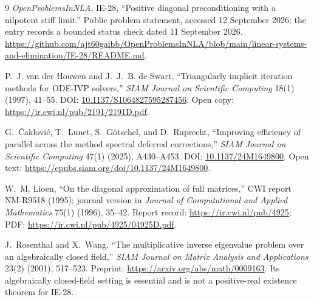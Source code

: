 \documentclass[11pt]{article}
\theoremstyle{remark}\newtheorem{remark}[theorem]{Remark}
\begin{document}
\begin{thebibliography}{9}
\emph{OpenProblemsInNLA}, IE-28, ``Positive diagonal preconditioning with a
nilpotent stiff limit.'' Public problem statement, accessed 12 September 2026;
the entry records a bounded status check dated 11 September 2026.
\url{https://github.com/ajt60gaibb/OpenProblemsInNLA/blob/main/linear-systems-and-elimination/IE-28/README.md}.

P.~J. van der Houwen and J.~J.~B. de Swart,
``Triangularly implicit iteration methods for ODE-IVP solvers,''
\emph{SIAM Journal on Scientific Computing} 18(1) (1997), 41--55.
DOI: \href{https://doi.org/10.1137/S1064827595287456}{10.1137/S1064827595287456}.
Open copy: \url{https://ir.cwi.nl/pub/2191/2191D.pdf}.

G.~\v{C}aklovi\'{c}, T.~Lunet, S.~G\"otschel, and D.~Ruprecht,
``Improving efficiency of parallel across the method spectral deferred
corrections,'' \emph{SIAM Journal on Scientific Computing} 47(1) (2025),
A430--A453. DOI: \href{https://doi.org/10.1137/24M1649800}{10.1137/24M1649800}.
Open text: \url{https://epubs.siam.org/doi/10.1137/24M1649800}.

W.~M. Lioen, ``On the diagonal approximation of full matrices,'' CWI report
NM-R9518 (1995); journal version in \emph{Journal of Computational and Applied
Mathematics} 75(1) (1996), 35--42.
Report record: \url{https://ir.cwi.nl/pub/4925};
PDF: \url{https://ir.cwi.nl/pub/4925/04925D.pdf}.

J.~Rosenthal and X.~Wang, ``The multiplicative inverse eigenvalue problem over
an algebraically closed field,'' \emph{SIAM Journal on Matrix Analysis and
Applications} 23(2) (2001), 517--523.
Preprint: \url{https://arxiv.org/abs/math/0009163}.
Its algebraically closed-field setting is essential and is not a
positive-real existence theorem for IE-28.
\end{thebibliography}
\end{document}
